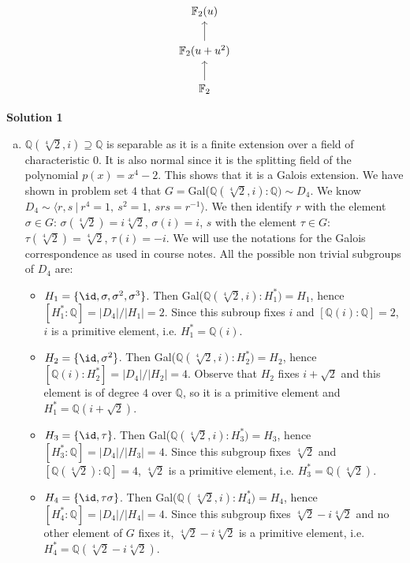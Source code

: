 \documentclass[12pt,a4paper]{article}
\newcommand{\Q}{\mathbb{Q}}
\begin{document}
\begin{enumerate}[label = \alph*)]
\[	\begin{tikzcd}
	\mathbb{F}_2(u) \\
	\mathbb{F}_2(u + u^2) \arrow [u] \\
	\mathbb{F}_2 \arrow[u]
	\end{tikzcd} \]
	
\end{enumerate}

\textbf{Solution 1}\\
\begin{enumerate}[e)]
\item $\mathbb{Q}(\sqrt[4]{2}, i)\supseteq \Q$ is separable as it is a finite extension over a field of characteristic $0$. It is also normal since it is the splitting field of the polynomial $p(x)=x^4-2$. This shows that it is a Galois extension. We have shown in problem set $4$ that $G=$Gal($\mathbb{Q}(\sqrt[4]{2}, i): \Q)\sim D_4$. We know $D_4 \sim \langle r, s\ | \ r^4=1, \ s^2=1, \ srs=r^{-1}\rangle $. We then identify $r$ with the element $\sigma \in G$: $\sigma(\sqrt[4]{2})=i\sqrt[4]{2}$, $\sigma(i)=i$, $s$ with the element $\tau \in G$: $\tau(\sqrt[4]{2})=\sqrt[4]{2}$, $\tau(i)=-i$.
We will use the notations for the Galois correspondence as used in course notes. 
All the possible non trivial subgroups of $D_4$ are: 
\begin{itemize}
\item $H_1=\{\id, \sigma, \sigma^2, \sigma^3\}$. Then Gal($\mathbb{Q}(\sqrt[4]{2}, i): H_1^*)=H_1$, hence $[H_1^*:\Q]=|D_4|/|H_1|= 2$. Since this subroup fixes $i$ and $[\mathbb{Q}(i):\Q]=2$, $i$ is a primitive element, i.e. $H_1^*=\Q(i)$. 
\item $H_2=\{\id, \sigma^2\}$. Then Gal($\mathbb{Q}(\sqrt[4]{2}, i): H_2^*)=H_2$, hence $[\mathbb{Q}(i):H_2^*]=|D_4|/|H_2|= 4$. Observe that $H_2$ fixes $i + \sqrt{2}$ and this element is of degree $4$ over $\Q$, so it is a primitive element and $H_1^*=\Q(i+\sqrt{2})$. 
\item$H_3=\{\id, \tau\}$. Then Gal($\mathbb{Q}(\sqrt[4]{2}, i): H_3^*)=H_3$, hence $[H_3^*:\Q]=|D_4|/|H_3|= 4$. Since this subgroup fixes $\sqrt[4]{2}$ and $[\mathbb{Q}(\sqrt[4]{2}):\Q]=4$, $\sqrt[4]{2}$ is a primitive element, i.e. $H_3^*=\Q(\sqrt[4]{2})$.
\item $H_4 = \{\id, \tau\sigma\}$. Then Gal($\mathbb{Q}(\sqrt[4]{2}, i): H_4^*)=H_4$, hence $[H_4^*:\Q]=|D_4|/|H_4|= 4$. Since this subgroup fixes $\sqrt[4]{2} -i\sqrt[4]{2}$ and no other element of $G$ fixes it, $\sqrt[4]{2} -i\sqrt[4]{2}$ is a primitive element, i.e. $H_4^*=\Q(\sqrt[4]{2} -i\sqrt[4]{2})$.

\end{itemize}
\end{enumerate}
\end{document}
